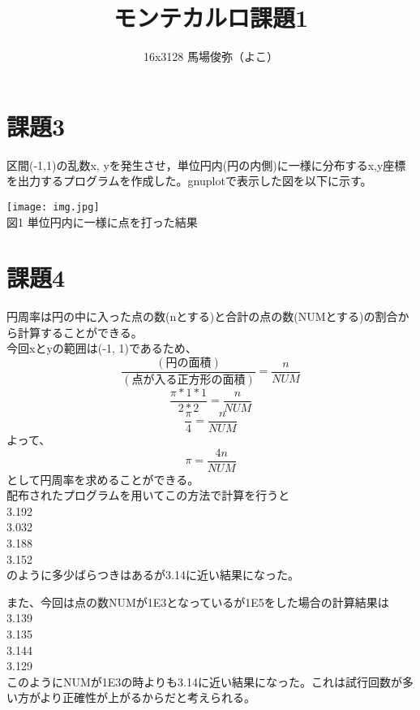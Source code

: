 \documentclass[dvipdfmx,autodetect-engine]{jsarticle}%
\title{モンテカルロ課題1}
\author{16x3128 馬場俊弥（よこ）}
\date{}
\begin{document}
\maketitle
\section{課題3}
区間(-1,1)の乱数x, yを発生させ，単位円内(円の内側)に一様に分布するx,y座標を出力するプログラムを作成した。gnuplotで表示した図を以下に示す。



\begin{center}
\texttt{[image: img.jpg]}\\
図1 単位円内に一様に点を打った結果
\end{center}

\section{課題4}
円周率は円の中に入った点の数(nとする)と合計の点の数(NUMとする)の割合から計算することができる。\\
今回xとyの範囲は(-1, 1)であるため、
\[\frac{(円の面積)}{(点が入る正方形の面積)} = \frac{n}{NUM}\]
\[\frac{π * 1 * 1}{2 * 2} = \frac{n}{NUM}\]
\[\frac{π}{4} = \frac{n}{NUM}\]
よって、\\
\[π = \frac{4n}{NUM}\]
として円周率を求めることができる。\\
配布されたプログラムを用いてこの方法で計算を行うと\\
3.192\\
3.032\\
3.188\\
3.152\\
のように多少ばらつきはあるが3.14に近い結果になった。


また、今回は点の数NUMが1E3となっているが1E5をした場合の計算結果は\\
3.139\\
3.135\\
3.144\\
3.129\\
このようにNUMが1E3の時よりも3.14に近い結果になった。これは試行回数が多い方がより正確性が上がるからだと考えられる。
\end{document}
